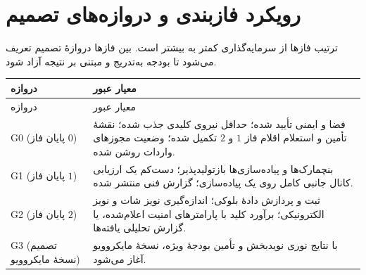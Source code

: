 \section{رویکرد فازبندی و دروازه‌های تصمیم}
\label{sec:gates}
ترتیب فازها از سرمایه‌گذاری کمتر به بیشتر است. بین فازها دروازهٔ تصمیم تعریف می‌شود تا بودجه به‌تدریج و مبتنی بر نتیجه آزاد شود.

\begin{longtable}{R{2.97cm}R{12.35cm}}
\toprule {} دروازه & معیار عبور \\ \midrule
\endfirsthead
\toprule {} دروازه & معیار عبور \\ \midrule
\endhead
G0 (پایان فاز $0$) & فضا و ایمنی تأیید شده؛ حداقل نیروی کلیدی جذب شده؛ نقشهٔ تأمین و استعلام اقلام فاز $1$ و $2$ تکمیل شده؛ وضعیت مجوزهای واردات روشن شده. \\
G1 (پایان فاز $1$) & بنچمارک‌ها و پیاده‌سازی‌ها بازتولیدپذیر؛ دست‌کم یک ارزیابی کانال جانبی کامل روی یک پیاده‌سازی؛ گزارش فنی منتشر شده. \\
G2 (پایان فاز $2$) & ثبت و پردازش دادهٔ بلوکی؛ اندازه‌گیری نویز شات و نویز الکترونیکی؛ برآورد کلید با پارامترهای امنیت اعلام‌شده، یا گزارش تحلیلی یافته‌ها. \\
G3 (تصمیم نسخهٔ مایکروویو) & با نتایج نوری نویدبخش و تأمین بودجهٔ ویژه، نسخهٔ مایکروویو آغاز می‌شود. \\
\bottomrule\end{longtable}

